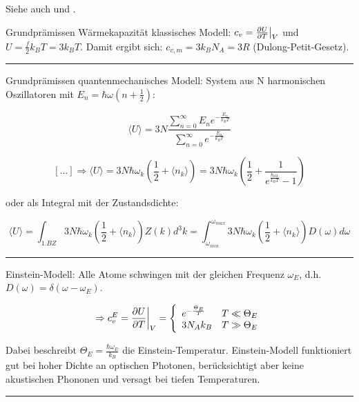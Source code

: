 \label{q:57}

Siehe auch  und .

Grundprämissen Wärmekapazität klassisches Modell: \( c_v = \pdv{U}{T} \big\rvert_V \) und \( U = \frac{f}{2} k_B T = 3 k_B T \). Damit ergibt sich: \( c_{v, m} = 3 k_B N_A = 3R \) (Dulong-Petit-Gesetz).

\vspace{.2cm}
\hrule
\vspace{.2cm}

Grundprämissen quantenmechanisches Modell: System aus N harmonischen Oszillatoren mit \( E_n = \hbar \omega \left(n + \frac{1}{2}\right) \): 

\[ \langle U \rangle = 3N \frac{\sum_{n=0}^\infty E_n e^{-\frac{E_n}{k_B T}}}{\sum_{n=0}^\infty e^{-\frac{E_n}{k_B T}}} \] 

\[ [\dots] \Rightarrow \langle U \rangle = 3N\hbar\omega_k\left(\frac{1}{2}+\langle n_k\rangle \right) = 3N\hbar\omega_k\left(\frac{1}{2}+ \frac{1}{e^{\frac{\hbar\omega_k}{k_BT}}-1} \right) \] 

oder als Integral mit der Zustandsdichte:

\[ \langle U \rangle = \displaystyle\int_{1. BZ} 3N\hbar\omega_k\left(\frac{1}{2}+\langle n_k\rangle \right) Z(k) d^3k = \displaystyle\int_{\omega_{min}}^{\omega_{max}} 3N\hbar\omega_k\left(\frac{1}{2}+\langle n_k\rangle \right) D(\omega) d\omega\]

\vspace{.2cm}
\hrule
\vspace{.2cm}

Einstein-Modell: Alle Atome schwingen mit der gleichen Frequenz $\omega_E$, d.h. $D(\omega) = \delta(\omega-\omega_E)$.

\[\Rightarrow c_v^E  = \pdv{U}{T} \bigg\rvert_V  = \left\{ \begin{array}{ll}
    e^{-\frac{\Theta_E}{T}} & T \ll \Theta_E \\
    3 N_A k_B  & T \gg \Theta_E \\
    \end{array} \right. 
\]

Dabei beschreibt $\Theta_E = \frac{\hbar \omega_E}{k_B}$ die Einstein-Temperatur.
Einstein-Modell funktioniert gut bei hoher Dichte an optischen Photonen, berücksichtigt aber keine akustischen Phononen und versagt bei tiefen Temperaturen.

\vspace{.2cm}
\hrule
\vspace{.2cm}

